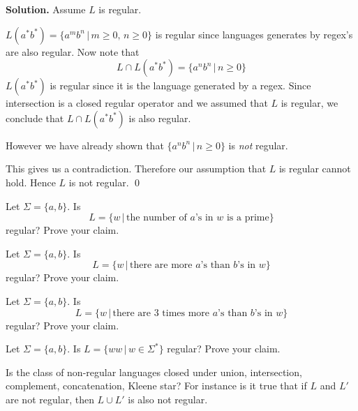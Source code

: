 \textbf{Solution.} Assume $L$ is regular.

$L(a^*b^*) = \{a^mb^n\,|\, m\geq 0, \, n \geq 0\}$ is 
regular since languages generates by regex's are also regular.
Now note that
\[
L \cap L(a^*b^*) = \{a^nb^n \,|\, n \geq 0\}
\]
$L(a^*b^*)$ is regular since it is the language generated by a regex.
Since intersection is a closed regular operator and we assumed that
$L$ is regular, we conclude that $L \cap L(a^*b^*)$ is also regular.

However we have already shown that $\{a^nb^n \,|\, n \geq 0\}$ is
\textit{not} regular.

This gives us a contradiction.
Therefore our assumption that $L$ is regular cannot hold.
Hence $L$ is not regular.
\qed



\newpage
\begin{ex} Let $\Sigma = \{a,b\}$.
Is 
\[
L = \{w \,|\, \text{the number of $a$'s in $w$ is a prime} \}
\]
regular? Prove your claim.
\end{ex}



\newpage
\begin{ex} Let $\Sigma = \{a,b\}$.
Is 
\[
L = \{w \,|\, \text{there are more $a$'s than $b$'s in $w$} \}
\]
regular? Prove your claim.
\end{ex}



\newpage
\begin{ex} Let $\Sigma = \{a,b\}$.
Is 
\[
L = \{w \,|\, \text{there are 3 times more $a$'s than $b$'s in $w$} \}
\]
regular? Prove your claim.
\end{ex}
\vspace{0.1in}



\newpage
\begin{ex} Let $\Sigma = \{a,b\}$.
Is $L = \{ww \,|\, w \in \Sigma^*\}$ regular? Prove your claim.
\end{ex}
\vspace{0.1in}


\newpage
\begin{ex}
Is the class of non-regular languages closed under union,
intersection, complement, concatenation, Kleene star?
For instance is it true that if $L$ and $L'$ are not regular,
then $L \cup L'$ is also not regular.
\end{ex}
